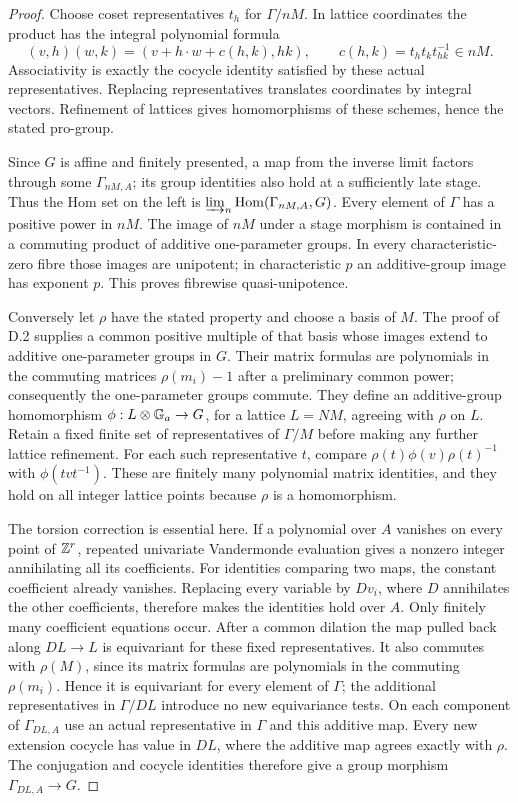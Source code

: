 \begin{proof}
Choose coset representatives $t_h$ for $\Gamma/nM$. In lattice coordinates
the product has the integral polynomial formula
\[
 (v,h)(w,k)=(v+h\cdot w+c(h,k),hk),
 \qquad c(h,k)=t_ht_kt_{hk}^{-1}\in nM.
\]
Associativity is exactly the cocycle identity satisfied by these actual
representatives. Replacing representatives translates coordinates by
integral vectors. Refinement of lattices gives homomorphisms of these
schemes, hence the stated pro-group.

Since $G$ is affine and finitely presented, a map from the inverse limit
factors through some $\Gamma_{nM,A}$; its group identities also hold at
a sufficiently late stage. Thus the Hom set on the left is
$\varinjlim_n\operatorname{Hom}(\Gamma_{nM,A},G)$. Every element of $\Gamma$ has
a positive power in $nM$. The image of $nM$ under a stage morphism
is contained in a commuting product of additive one-parameter groups.
In every characteristic-zero fibre those images are unipotent;
in characteristic $p$ an additive-group image has exponent $p$.
This proves fibrewise quasi-unipotence.

Conversely let $\rho$ have the stated property and choose a basis of $M$.
The proof of D.2 supplies a common positive multiple of that basis whose
images extend to additive one-parameter groups in $G$. Their matrix
formulas are polynomials in the commuting matrices $\rho(m_i)-1$
after a preliminary common power; consequently the one-parameter
groups commute. They define an additive-group homomorphism
$\phi:L\otimes\mathbb G_a\to G$, for a lattice $L=NM$, agreeing with
$\rho$ on $L$. Retain a fixed finite set of representatives of
$\Gamma/M$ before making any further lattice refinement. For each
such representative $t$, compare
$\rho(t)\phi(v)\rho(t)^{-1}$ with $\phi(tvt^{-1})$.
These are finitely many polynomial matrix identities, and they
hold on all integer lattice points because $\rho$ is a homomorphism.

The torsion correction is essential here. If a polynomial over $A$
vanishes on every point of $\mathbb Z^r$, repeated univariate Vandermonde
evaluation gives a nonzero integer annihilating all its coefficients.
For identities comparing two maps, the constant coefficient already
vanishes. Replacing every variable by $Dv_i$, where $D$ annihilates
the other coefficients, therefore makes the identities hold over $A$.
Only finitely many coefficient equations occur. After a common
dilation the map pulled back along $DL\to L$ is equivariant for
these fixed representatives. It also commutes with $\rho(M)$,
since its matrix formulas are polynomials in the commuting
$\rho(m_i)$. Hence it is equivariant for every element of $\Gamma$;
the additional representatives in $\Gamma/DL$ introduce no new
equivariance tests. On each component of $\Gamma_{DL,A}$ use an
actual representative in $\Gamma$ and this additive map. Every
new extension cocycle has value in $DL$, where the additive map
agrees exactly with $\rho$. The conjugation and cocycle identities
therefore give a group morphism $\Gamma_{DL,A}\to G$.


\end{proof}
